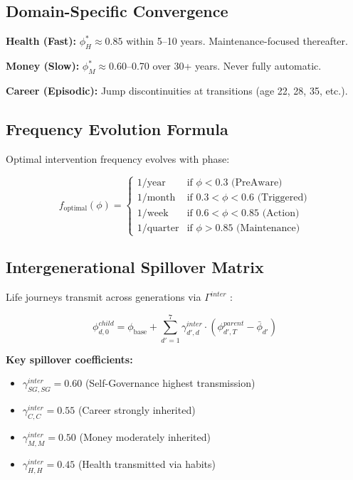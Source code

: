 \subsection{Domain-Specific Convergence}

\textbf{Health (Fast):} $\phi^*_H \approx 0.85$ within 5--10 years. Maintenance-focused thereafter.

\textbf{Money (Slow):} $\phi^*_M \approx 0.60$--0.70 over 30+ years. Never fully automatic.

\textbf{Career (Episodic):} Jump discontinuities at transitions (age 22, 28, 35, etc.).

\subsection{Frequency Evolution Formula}

Optimal intervention frequency evolves with phase:

\begin{equation}
\boxed{
f_{\text{optimal}}(\phi) = \begin{cases}
1/\text{year} & \text{if } \phi < 0.3 \text{ (PreAware)} \\
1/\text{month} & \text{if } 0.3 < \phi < 0.6 \text{ (Triggered)} \\
1/\text{week} & \text{if } 0.6 < \phi < 0.85 \text{ (Action)} \\
1/\text{quarter} & \text{if } \phi > 0.85 \text{ (Maintenance)}
\end{cases}
}
\end{equation}

\subsection{Intergenerational Spillover Matrix}

Life journeys transmit across generations via $\Gamma^{inter}$ \citep{doepke2017parenting, chowdhury2022preferences, sacerdote2007nature}:

\begin{equation}
\boxed{
\phi^{child}_{d,0} = \phi_{\text{base}} + \sum_{d'=1}^{7} \gamma^{inter}_{d',d} \cdot \left(\phi^{parent}_{d',T} - \bar{\phi}_{d'}\right)
}
\end{equation}

\textbf{Key spillover coefficients:}
\begin{itemize}[nosep]
\item $\gamma^{inter}_{SG,SG} = 0.60$ (Self-Governance highest transmission)
\item $\gamma^{inter}_{C,C} = 0.55$ (Career strongly inherited)
\item $\gamma^{inter}_{M,M} = 0.50$ (Money moderately inherited)
\item $\gamma^{inter}_{H,H} = 0.45$ (Health transmitted via habits)
\end{itemize}

